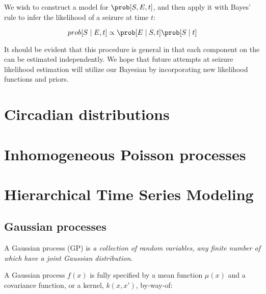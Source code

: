 We wish to construct a model for $\prob[S, E, t]$, and then apply it with Bayes' rule to infer the likelihood of a seizure at time $t$:

\begin{equation}
prob[S \mid E, t] \propto \prob[E \mid S, t] \prob[S \mid t]
\end{equation}

It should be evident that this procedure is general in that each component on the \rhs can be estimated independently. We hope that future attempts at seizure likelihood estimation will utilize our Bayesian by incorporating new likelihood functions and priors.

\section{Circadian distributions}


\section{Inhomogeneous Poisson processes}



\section{Hierarchical Time Series Modeling}



\subsection{Gaussian processes}
\label{sec:2background:GPs}
A Gaussian process (GP) \cite{rasmussen2006cki} is \emph{a collection of random variables, any finite number of which have a joint Gaussian distribution}.

A Gaussian process $f(x)$ is fully specified by a mean function $\mu(x)$ and a covariance function, or a kernel, $k(x,x')$, by-way-of:

